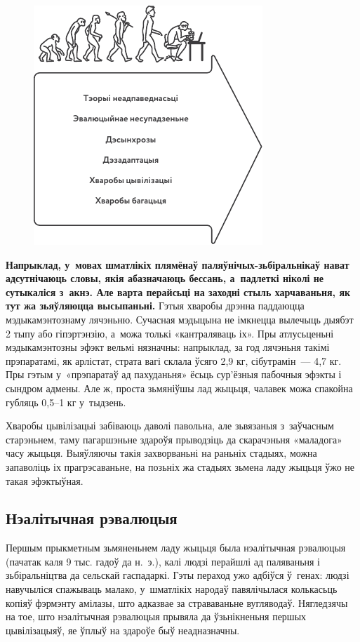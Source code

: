 \begin{figure}[htb!]
  \centering
  \includegraphics[scale=1.3]{willpower/ch2/3.pdf}
\end{figure}

\textbf{Напрыклад, у~мовах шматлікіх плямёнаў паляўнічых-зьбіральнікаў нават адсутнічаюць словы, якія абазначаюць бессань, а~падлеткі ніколі не сутыкаліся з~акнэ. Але варта перайсьці на заходні стыль харчаваньня, як тут жа зьяўляюцца высыпаньні.} Гэтыя хваробы дрэнна паддаюцца мэдыкамэнтознаму лячэньню. Сучасная мэдыцына не імкнецца вылечыць дыябэт 2 тыпу або гіпэртэнзію, а~можа толькі «кантраляваць іх». Пры атлусьценьні мэдыкамэнтозны эфэкт вельмі нязначны: напрыклад, за год лячэньня такімі прэпаратамі, як арлістат, страта вагі склала ўсяго 2,9 кг, сібутрамін~--- 4,7 кг. Пры гэтым у~«прэпаратаў ад пахуданьня» ёсьць сур'ёзныя пабочныя эфэкты і сындром адмены. Але ж, проста зьмяніўшы лад жыцьця, чалавек можа спакойна губляць 0,5--1 кг у~тыдзень.

Хваробы цывілізацыі забіваюць даволі павольна, але зьвязаныя з~заўчасным старэньнем, таму пагаршэньне здароўя прыводзіць да скарачэньня «маладога» часу жыцьця. Выяўляючы такія захворваньні на раньніх стадыях, можна запаволіць іх прагрэсаваньне, на позьніх жа стадыях зьмена ладу жыцьця ўжо не такая эфэктыўная.

\subsection*{Нэалітычная рэвалюцыя}

Першым прыкметным зьмяненьнем ладу жыцьця была нэалітычная рэвалюцыя (пачатак каля 9 тыс. гадоў да н.~э.), калі людзі перайшлі ад паляваньня і зьбіральніцтва да сельскай гаспадаркі. Гэты пераход ужо адбіўся ў~генах: людзі навучыліся спажываць малако, у~шматлікіх народаў павялічылася колькасьць копіяў фэрмэнту амілазы, што адказвае за страваваньне вугляводаў. Нягледзячы на тое, што нэалітычная рэвалюцыя прывяла да ўзьнікненьня першых цывілізацыяў, яе ўплыў на здароўе быў неадназначны.

